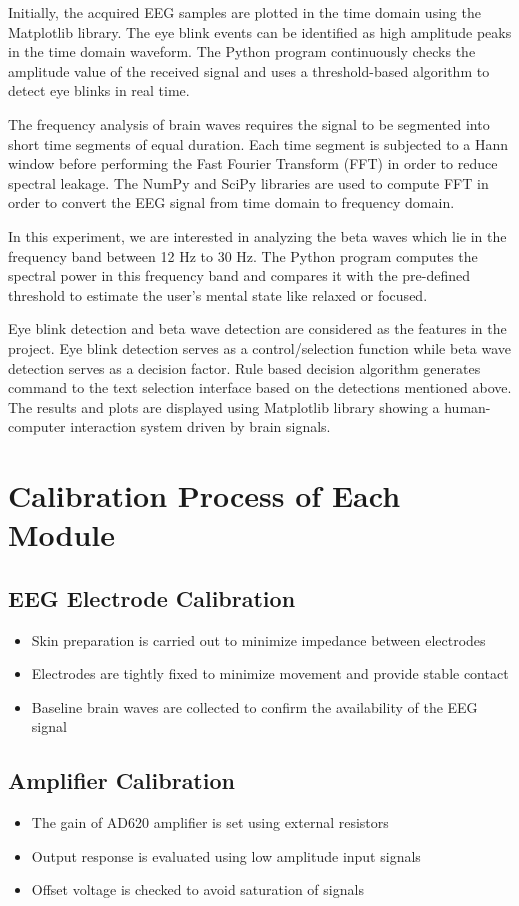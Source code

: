 Initially, the acquired EEG samples are plotted in the time domain using the Matplotlib library. The eye blink events can be identified as high amplitude peaks in the time domain waveform. The Python program continuously checks the amplitude value of the received signal and uses a threshold-based algorithm to detect eye blinks in real time.

The frequency analysis of brain waves requires the signal to be segmented into short time segments of equal duration. Each time segment is subjected to a Hann window before performing the Fast Fourier Transform (FFT) in order to reduce spectral leakage. The NumPy and SciPy libraries are used to compute FFT in order to convert the EEG signal from time domain to frequency domain.

In this experiment, we are interested in analyzing the beta waves which lie in the frequency band between 12 Hz to 30 Hz. The Python program computes the spectral power in this frequency band and compares it with the pre-defined threshold to estimate the user's mental state like relaxed or focused.

Eye blink detection and beta wave detection are considered as the features in the project. Eye blink detection serves as a control/selection function while beta wave detection serves as a decision factor. Rule based decision algorithm generates command to the text selection interface based on the detections mentioned above. The results and plots are displayed using Matplotlib library showing a human-computer interaction system driven by brain signals.


\section{Calibration Process of Each Module}
\subsection{EEG Electrode Calibration}
\begin{itemize}
	\item Skin preparation is carried out to minimize impedance between electrodes
	\item Electrodes are tightly fixed to minimize movement and provide stable contact
	\item Baseline brain waves are collected to confirm the availability of the EEG signal
\end{itemize}

\subsection{Amplifier Calibration}
\begin{itemize}
	\item The gain of AD620 amplifier is set using external resistors
	\item Output response is evaluated using low amplitude input signals
	\item Offset voltage is checked to avoid saturation of signals
\end{itemize}


